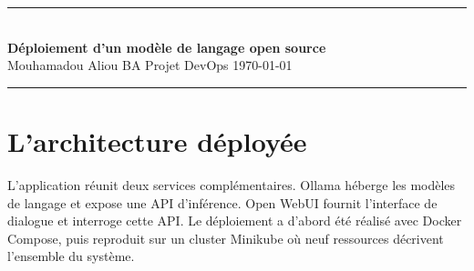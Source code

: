 \documentclass[10pt,a4paper]{article}
\begin{document}
\begin{center}
{\color{accent}\rule{\textwidth}{1pt}}\\[3pt]

{\sffamily\LARGE\bfseries\color{encre}
Déploiement d'un modèle de langage open source}\\[2pt]


{\sffamily\small\color{gris}
Mouhamadou Aliou BA
\quad\textbullet\quad
Projet DevOps
\quad\textbullet\quad
\today}\\[2pt]

{\color{accent}\rule{\textwidth}{1pt}}
\end{center}

\section{L'architecture déployée}
\thispagestyle{empty}
L'application réunit deux services complémentaires. Ollama héberge les modèles
de langage et expose une API d'inférence. Open WebUI fournit l'interface de
dialogue et interroge cette API. Le déploiement a d'abord été réalisé avec
Docker Compose, puis reproduit sur un cluster Minikube où neuf ressources
décrivent l'ensemble du système.
\end{document}
